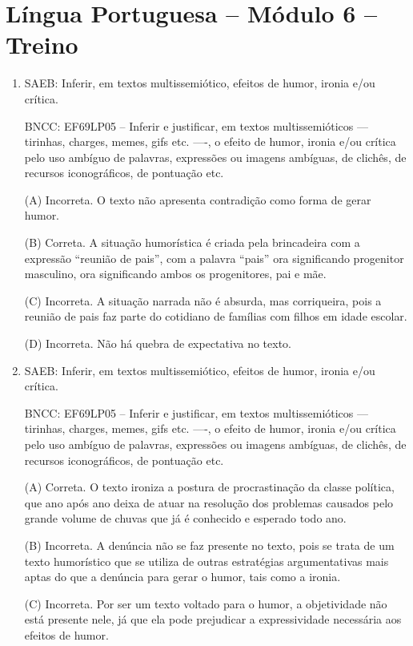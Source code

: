 \section*{Língua Portuguesa – Módulo 6 – Treino}

\begin{enumerate}
\item

SAEB: Inferir, em textos multissemiótico, efeitos de humor, ironia e/ou
crítica. 

BNCC: EF69LP05 -- Inferir e justificar, em textos
multissemióticos --- tirinhas, charges, memes, gifs etc. ----, o efeito
de humor, ironia e/ou crítica pelo uso ambíguo de palavras, expressões
ou imagens ambíguas, de clichês, de recursos iconográficos, de pontuação
etc.

(A) Incorreta. O texto não apresenta contradição como forma de gerar
humor. 

(B) Correta. A situação humorística é criada pela brincadeira com
a expressão ``reunião de pais'', com a palavra ``pais'' ora significando
progenitor masculino, ora significando ambos os progenitores, pai e mãe.

(C) Incorreta. A situação narrada não é absurda, mas corriqueira, pois a
reunião de pais faz parte do cotidiano de famílias com filhos em idade
escolar. 

(D) Incorreta. Não há quebra de expectativa no texto.

\item
SAEB: Inferir, em textos multissemiótico, efeitos de humor, ironia e/ou
crítica.

BNCC: EF69LP05 -- Inferir e justificar, em textos
multissemióticos --- tirinhas, charges, memes, gifs etc. ----, o efeito
de humor, ironia e/ou crítica pelo uso ambíguo de palavras, expressões
ou imagens ambíguas, de clichês, de recursos iconográficos, de pontuação
etc.

(A) Correta. O texto ironiza a postura de procrastinação da classe
política, que ano após ano deixa de atuar na resolução dos problemas
causados pelo grande volume de chuvas que já é conhecido e esperado todo
ano. 

(B) Incorreta. A denúncia não se faz presente no texto, pois se
trata de um texto humorístico que se utiliza de outras estratégias
argumentativas mais aptas do que a denúncia para gerar o humor, tais
como a ironia. 

(C) Incorreta. Por ser um texto voltado para o humor, a
objetividade não está presente nele, já que ela pode prejudicar a
expressividade necessária aos efeitos de humor. 


\end{enumerate}
